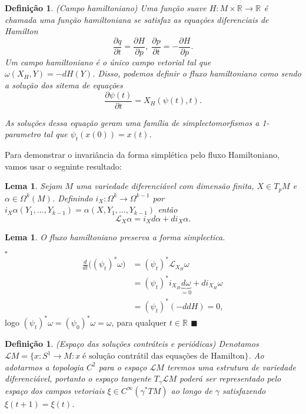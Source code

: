 \documentclass[12pt]{book}
\newtheorem{lema}[teorema]{Lema}
\newtheorem{definicao}[teorema]{Definição}
\newenvironment{prova}[1]{$\square$ #1}{\hfill$\blacksquare$}
\newcommand{\bigparenteses}[1]{\big( #1 \big) }
\newcommand{\circulo}{S^{1}}
\newcommand{\derivadaparcial}[2]{\frac{\partial #1}{\partial #2}}
\newcommand{\liederivada}[1]{\mathcal{L}_{#1}}
\newcommand{\real}[1]{\mathbb{R}^{#1}}
\newcommand{\solucoesperiodicascontrateis}{\mathcal{L}M}
\begin{document}
	\begin{definicao}
		(Campo hamiltoniano) Uma função suave $H : M \times \real{} \to \real{}$ é chamada uma função hamiltoniana se satisfaz as equações diferenciais de Hamilton
		$$
		\frac{\partial q}{\partial t} = \frac{\partial H}{\partial p}, \; \frac{\partial p}{\partial t} = -\frac{\partial H}{\partial p}. 
		$$
		Um campo hamiltoniano é o único campo vetorial tal que $\omega(X_{H}, Y) = -dH(Y)$. Disso, podemos definir o fluxo hamiltoniano como sendo a solução dos sitema de equações 
		$$
		\label{sisHamilt}
		\derivadaparcial{\psi(t)}{t} = X_{H}(\psi(t), t).
		$$
		
		As soluções dessa equação geram uma família de simplectomorfismos a 1-parametro tal que $\psi_{t}(x(0)) = x(t)$.
	\end{definicao}
	Para demonstrar o invariância da forma simplética pelo fluxo Hamiltoniano, vamos usar o seguinte resultado:
	\begin{lema}
		Sejam $M$ uma variedade diferenciável com dimensão finita, $X \in T_{p}M$ e $\alpha \in \Omega^{k}(M)$. Definindo $i_{X}:\Omega^{k} \to \Omega^{k-1}$ por $i_{X}\alpha(Y_{1}, \dots, Y_{k-1}) = \alpha(X, Y_{1}, \dots, Y_{k-1})$ então
		$$
		\liederivada{X}\alpha = i_{X}d\alpha + di_{X}\alpha.
		$$
	\end{lema}
	\begin{lema}
		O fluxo hamiltoniano preserva a forma simplectica.
	\end{lema}
	\begin{prova}\label{fluxo_convervativo}
			$$
			\begin{aligned}
			\frac{d}{dt}\bigparenteses{(\psi_{t})^{*}\omega} 
			&= (\psi_{t})^{*} \liederivada{X_{H}}\omega  
			\\
			&= (\psi_{t})^{*} i_{X_{H}}\underbrace{d\omega }_ {=0}+ di_{X_{H}}\omega 
			\\
			&= (\psi_{t})^{*} (-ddH)=0,
			\end{aligned}
			$$
			logo $(\psi_{t})^{*} \omega = (\psi_{0})^{*} \omega = \omega$, para qualquer $t \in \real{}$
	\end{prova}
	
	\begin{definicao}\label{definicao_solucoes_periodicas_contratei}
		(Espaço das soluções contráteis e periódicas) Denotamos $\solucoesperiodicascontrateis = \{x:\circulo \to M: x \; \text{é solução contrátil das equações de Hamilton} \}$. Ao adotarmos a topologia $C^{2}$ para o espaço $\solucoesperiodicascontrateis$ teremos uma estrutura de variedade diferenciável, portanto o espaço tangente $T_{\gamma}\solucoesperiodicascontrateis$ poderá ser representado pelo espaço dos campos vetoriais $\xi \in  C^{\infty}(\gamma^{*}TM)$ ao longo de $\gamma$ satisfazendo $\xi(t+1) = \xi(t)$.
	\end{definicao}	
	
\end{document}
